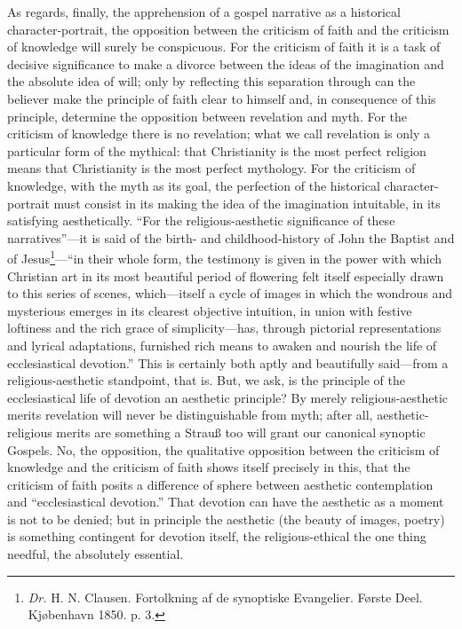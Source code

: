 \documentclass[12pt]{book}
\newcommand{\opage}[1]{\marginnote{\footnotesize\textit{[#1]}}}
\begin{document}
As regards, finally, the apprehension of a gospel narrative as a historical character-portrait, the opposition between the criticism of faith and the criticism of knowledge will surely be conspicuous. For the criticism of faith it is a task of decisive significance to make a divorce between the ideas of the imagination and the absolute idea of will; only by reflecting this separation through can the believer make the principle of faith clear to himself and, in consequence of
\opage{61}\setcounter{footnote}{0}%
this principle, determine the opposition between revelation and myth. For the criticism of knowledge there is no revelation; what we call revelation is only a particular form of the mythical: that Christianity is the most perfect religion means that Christianity is the most perfect mythology. For the criticism of knowledge, with the myth as its goal, the perfection of the historical character-portrait must consist in its making the idea of the imagination intuitable, in its satisfying aesthetically. ``For the religious-aesthetic significance of these narratives''---it is said of %
the birth- and childhood-history of John the Baptist and of Jesus\footnote{\textit{Dr.} H. N. Clausen. Fortolkning af de synoptiske Evangelier. Første Deel. Kjøbenhavn 1850. p. 3.%
}---``in their whole form, the testimony is given in the power with which Christian art in its most beautiful period of flowering felt itself especially drawn to this series of scenes, which---itself a cycle of images in which the wondrous and mysterious emerges in its clearest objective intuition, in union with festive loftiness and the rich grace of simplicity---has, through pictorial representations and lyrical adaptations, furnished rich means to awaken and nourish the life of ecclesiastical devotion.'' This is certainly both aptly and beautifully said---from a religious-aesthetic standpoint, that is. But, we ask, is the principle of the ecclesiastical life of devotion an aesthetic principle? By merely religious-aesthetic merits revelation will never be distinguishable from myth; after all, aesthetic-religious merits are something a Strauß too will grant our canonical synoptic Gospels. No, the opposition, the qualitative opposition between the criticism of knowledge and the criticism of faith shows itself precisely in this, that the criticism of faith posits a difference of sphere between aesthetic contemplation and ``ecclesiastical devotion.'' That devotion can have the aesthetic as a moment is not to be denied; but in principle the aesthetic
\opage{62}\setcounter{footnote}{0}%
(the beauty of images, poetry) is something contingent for devotion itself, the religious-ethical the one thing needful, the absolutely essential.
\end{document}
